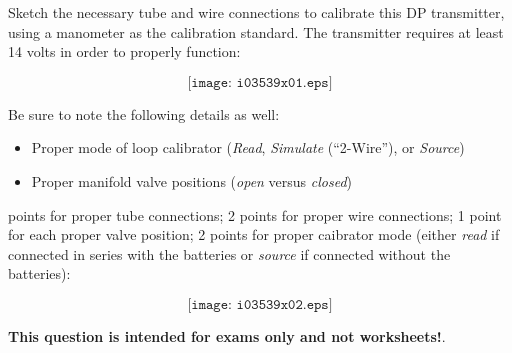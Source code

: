 

Sketch the necessary tube and wire connections to calibrate this DP transmitter, using a manometer as the calibration standard.  The transmitter requires at least 14 volts in order to properly function:

\vskip 10pt

$$\texttt{[image: i03539x01.eps]}$$

Be sure to note the following details as well:

\begin{itemize}
\item{} Proper mode of loop calibrator ({\it Read}, {\it Simulate} (``2-Wire''), or {\it Source})
\item{} Proper manifold valve positions ({\it open} versus {\it closed})
\end{itemize}







 points for proper tube connections; 2 points for proper wire connections; 1 point for each proper valve position; 2 points for proper caibrator mode (either {\it read} if connected in series with the batteries or {\it source} if connected without the batteries):

$$\texttt{[image: i03539x02.eps]}$$







{\bf This question is intended for exams only and not worksheets!}.



